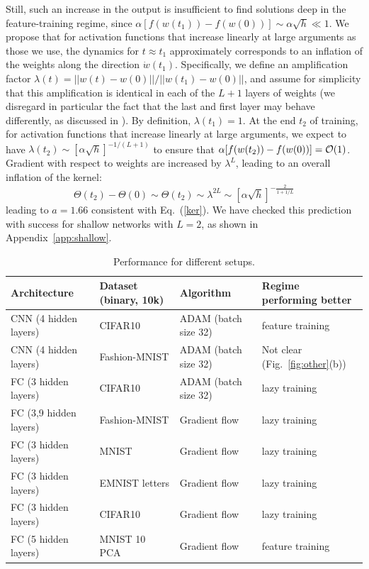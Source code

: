 \documentclass{article}
\newcommand{\be}{\begin{equation}}
\newcommand{\ee}{\end{equation}}
\renewcommand{\cite}[1]{\citep{#1}}
\newcommand{\abs}[1]{|\!|#1|\!|}
\newcommand{\eref}[1]{Eq.~(\ref{#1})}
\newcommand{\aref}[1]{Appendix~\ref{#1}}
\newcommand{\fref}[1]{Fig.~\ref{#1}}
\begin{document}
Still, such an increase in the output is insufficient to find solutions deep in the feature-training regime, since $\alpha [f(w(t_1))-f(w(0))]\sim \alpha \sqrt{h} \ll 1$. We propose that for activation functions that increase linearly at large arguments as those we use, the dynamics for $t \approx t_1$ approximately corresponds to an inflation of the weights  along the direction $\dot w(t_1)$. Specifically, we define an amplification factor $\lambda(t) = \abs{w(t)-w(0)}/\abs{ w(t_1)-w(0)}$, and assume for simplicity that this amplification is identical in each of the $L+1$ layers of weights (we disregard in particular the fact that the last and first layer may behave differently, as discussed in \cite{arora2019exact}).  By definition, $\lambda(t_1)=1$. At the end $t_2$ of training,  for activation functions that increase linearly at large arguments, we expect to have  $\lambda(t_2)\sim [\alpha \sqrt{h}]^{-1/(L+1)}$  to ensure that $\alpha [f(w(t_2))-f(w(0))]={\cal O}(1)$. Gradient with respect to weights are increased by $\lambda^L$, leading to an overall inflation of the kernel:
\be
\label{aa4}
\Theta(t_2)-\Theta(0)\sim \Theta(t_2)\sim \lambda^{2L}\sim [\alpha \sqrt{h}]^{-\frac{2}{1+1/L}}
\ee
leading to $a=1.66$ consistent with \eref{ker}. We have checked  this prediction with success for shallow networks with $L=2$, as shown in \aref{app:shallow}.



\begin{table}[b]
\centering
\caption{\label{tab:perf}Performance for different setups.}
\begin{tabular}{|l|l|l|l|} 
\hline
Architecture & Dataset (binary, 10k) & Algorithm & Regime performing better \\
\hline
CNN (4 hidden layers) & CIFAR10 & ADAM (batch size 32) & feature training \\
CNN (4 hidden layers) & Fashion-MNIST & ADAM (batch size 32) & Not clear (\fref{fig:other}(b)) \\
FC (3 hidden layers) & CIFAR10 & ADAM (batch size 32) & lazy training \\
FC (3,9 hidden layers) & Fashion-MNIST & Gradient flow & lazy training \\
FC (3 hidden layers) & MNIST & Gradient flow & lazy training \\
FC (3 hidden layers) & EMNIST letters & Gradient flow & lazy training \\
FC (3 hidden layers) & CIFAR10 & Gradient flow & lazy training \\
FC (5 hidden layers) & MNIST 10 PCA & Gradient flow & feature training \\
\hline
\end{tabular}
\end{table}
\end{document}
